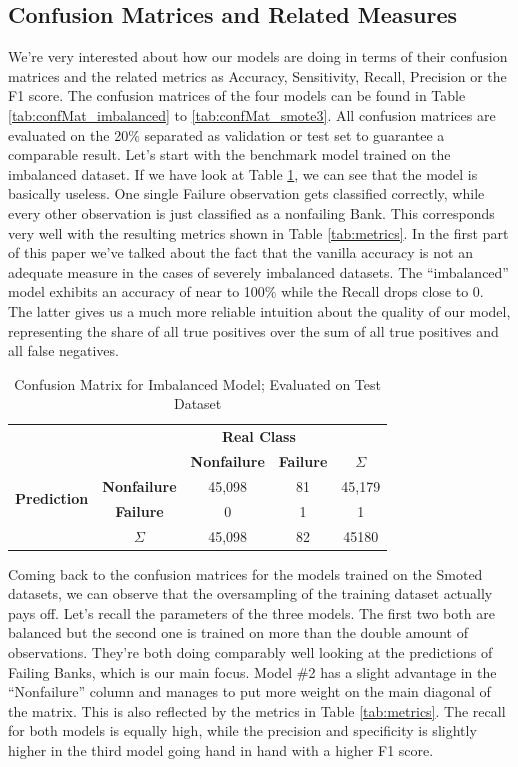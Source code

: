 \documentclass[12pt,a4paper]{article}
\begin{document}
\subsection{Confusion Matrices and Related Measures}
We're very interested about how our models are doing in terms of their confusion matrices and the related metrics as Accuracy, Sensitivity, Recall, Precision or the F1 score. The confusion matrices of the four models can be found in Table \vref{tab:confMat_imbalanced} to \vref{tab:confMat_smote3}. All confusion matrices are evaluated on the 20\% separated as validation or test set to guarantee a comparable result. Let's start with the benchmark model trained on the imbalanced dataset. If we have look at Table \ref{tab:confMat_imbalanced}, we can see that the model is basically useless. One single Failure observation gets classified correctly, while every other observation is just classified as a nonfailing Bank. This corresponds very well with the resulting metrics shown in Table \vref{tab:metrics}. In the first part of this paper we've talked about the fact that the vanilla accuracy is not an adequate measure in the cases of severely imbalanced datasets. The \enquote{imbalanced} model exhibits an accuracy of near to 100\% while the Recall drops close to 0. The latter gives us a much more reliable intuition about the quality of our model, representing the share of all true positives over the sum of all true positives and all false negatives. 
\begin{table}[]
\centering
\begin{tabular}{ccccc}
\multicolumn{2}{c}{} & \multicolumn{2}{c}{\textbf{Real Class}} &  \\
\multicolumn{2}{c}{} & \textbf{Nonfailure} & \textbf{Failure} & \textbf{$\Sigma$} \\ \cline{3-4}
\multirow{2}{*}{\textbf{Prediction}} & \multicolumn{1}{c|}{\textbf{Nonfailure}} & \multicolumn{1}{c|}{45,098} & \multicolumn{1}{c|}{81} & 45,179 \\ \cline{3-4}
 & \multicolumn{1}{c|}{\textbf{Failure}} & \multicolumn{1}{c|}{0} & \multicolumn{1}{c|}{1} & 1 \\ \cline{3-4}
 & \textbf{$\Sigma$} & 45,098 & 82 & 45180
\end{tabular}
\caption{Confusion Matrix for Imbalanced Model; Evaluated on Test Dataset}
\label{tab:confMat_imbalanced}
\end{table}
Coming back to the confusion matrices for the models trained on the Smoted datasets, we can observe that the oversampling of the training dataset actually pays off. Let's recall the parameters of the three models. The first two both are balanced but the second one is trained on more than the double amount of observations. They're both doing comparably well looking at the predictions of Failing Banks, which is our main focus. Model \#2 has a slight advantage in the \enquote{Nonfailure} column and manages to put more weight on the main diagonal of the matrix. This is also reflected by the metrics in Table \ref{tab:metrics}. The recall for both models is equally high, while the precision and specificity is slightly higher in the third model going hand in hand with a higher F1 score.
\end{document}
